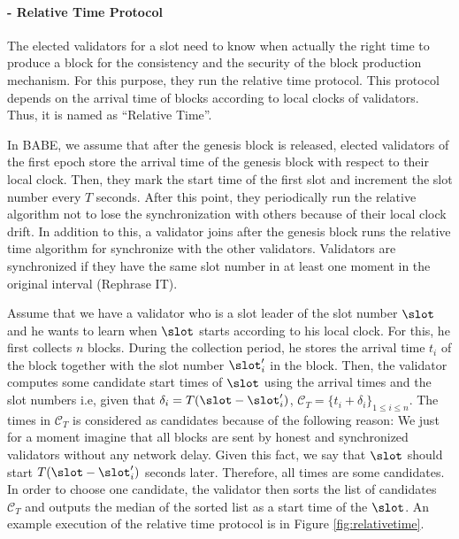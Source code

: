 


\paragraph{- Relative Time Protocol}



The elected validators for a slot need to know  when actually the right time to produce a block for the consistency and the security of the block production mechanism. For this purpose, they run the relative time protocol. This protocol depends on the arrival time of blocks according to local clocks of validators. Thus, it is named as ``Relative Time''.


In BABE, we assume that after the genesis block is released, elected validators of the first epoch store the arrival time of the genesis block with respect to their local clock. Then, they mark the start time of the first slot and increment the slot number every $ T $ seconds. After this point,  they periodically run the relative algorithm not to lose the synchronization with others because of their local clock drift.  In addition to this, a validator joins after the genesis block runs the relative time algorithm for synchronize with the other validators. Validators are synchronized if they have the same slot number in at least one moment in the original interval (Rephrase IT).


Assume that we have a validator who is a slot leader of the slot number $ \slot $ and  he wants to learn when $ \slot $ starts according to his local clock.  For this, he first collects $ n $ blocks. During the collection period, he stores  the arrival time $ t_i $ of the block together with the slot number $\slot'_i$ in the block. Then, the validator computes some candidate start times of $ \slot $ using the arrival times and the slot numbers i.e,  given that $ \delta_i = T(\slot - \slot'_i)  $,  $\mathcal{C}_T = \{t_i+\delta_i \}_{1 \leq i \leq n} $. The times in $ \mathcal{C}_T $ is considered as candidates because of the following reason: We just for a moment imagine that  all  blocks are sent by honest and synchronized validators without any network delay. Given this fact, we say that $ \slot $ should start $ T(\slot - \slot'_i) $ seconds later. Therefore, all times are some candidates. In order to  choose one candidate,  the validator then sorts the list of candidates $ \mathcal{C}_T $ and outputs the median of the sorted list as a start time of the $ \slot $. An example execution of the relative time protocol is in Figure \ref{fig:relativetime}.

